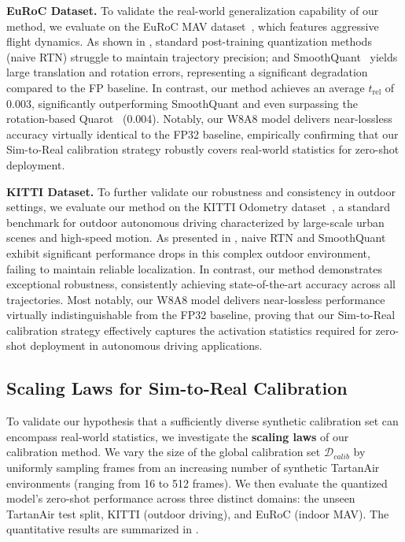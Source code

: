 \textbf{EuRoC Dataset.}\;\;
To validate the real-world generalization capability of our method, we evaluate on the EuRoC MAV dataset~\cite{euroc2016}, which features aggressive flight dynamics. As shown in , standard post-training quantization methods (naive RTN) struggle to maintain trajectory precision; and SmoothQuant~\cite{xiao2022smoothquant} yields large translation and rotation errors, representing a significant degradation compared to the FP baseline. In contrast, our method achieves an average $t_{\mathrm{rel}}$ of 0.003, significantly outperforming SmoothQuant and even surpassing the rotation-based Quarot~\cite{ashkboos2024quarot} (0.004). Notably, our W8A8 model delivers near-lossless accuracy virtually identical to the FP32 baseline, empirically confirming that our Sim-to-Real calibration strategy robustly covers real-world statistics for zero-shot deployment.


\textbf{KITTI Dataset.}\;
To further validate our robustness and consistency in outdoor settings, we evaluate our method on the KITTI Odometry dataset~\cite{kitti2012}, a standard benchmark for outdoor autonomous driving characterized by large-scale urban scenes and high-speed motion. As presented in , naive RTN and SmoothQuant~\cite{xiao2022smoothquant} exhibit significant performance drops in this complex outdoor environment, failing to maintain reliable localization. In contrast, our method demonstrates exceptional robustness, consistently achieving state-of-the-art accuracy across all trajectories. Most notably, our W8A8 model delivers near-lossless performance virtually indistinguishable from the FP32 baseline, proving that our Sim-to-Real calibration strategy effectively captures the activation statistics required for zero-shot deployment in autonomous driving applications.

 
\subsection{Scaling Laws for Sim-to-Real Calibration} 
\label{sec:scaling_law}




To validate our hypothesis that a sufficiently diverse synthetic calibration set can encompass real-world statistics, we investigate the \textbf{scaling laws} of our calibration method. We vary the size of the global calibration set $\mathcal{D}_{calib}$ by uniformly sampling frames from an increasing number of synthetic TartanAir environments (ranging from 16 to 512 frames). We then evaluate the quantized model's zero-shot performance across three distinct domains: the unseen TartanAir test split, KITTI (outdoor driving), and EuRoC (indoor MAV). The quantitative results are summarized in .

